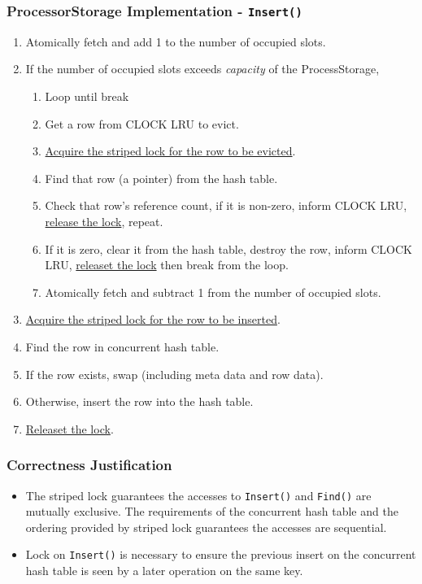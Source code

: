 \documentclass{beamer}
\begin{document}
\begin{frame}
\frametitle{ProcessorStorage Implementation - \texttt{Insert()}}
\begin{enumerate}
\item Atomically fetch and add 1 to the number of occupied slots.
\item If the number of occupied slots exceeds \emph{capacity} of the
ProcessStorage,
\begin{enumerate}
\item Loop until break
\item Get a row from CLOCK LRU to evict.
\item \underline{Acquire the striped lock for the row to be evicted}.
\item Find that row (a pointer) from the hash table.
\item Check that row's reference count, if it is non-zero, inform CLOCK LRU, 
  \underline{release the lock}, repeat.
\item If it is zero, clear it from the hash table, destroy the row,  inform CLOCK LRU,
  \underline{releaset the lock} then break from the loop.
\item Atomically fetch and subtract 1 from the number of occupied slots.
\end{enumerate}
\item \underline{Acquire the striped lock for the row to be inserted}.
\item Find the row in concurrent hash table.
\item If the row exists, swap (including meta data and row data).
\item Otherwise, insert the row into the hash table.
\item \underline{Releaset the lock}.
\end{enumerate}
\end{frame}

\begin{frame}
\frametitle{Correctness Justification}
\begin{itemize}
\item The striped lock guarantees the accesses to \texttt{Insert()} and
\texttt{Find()} are mutually exclusive. The requirements of the concurrent hash
table and the ordering provided by striped lock guarantees the accesses are
sequential.
\item Lock on \texttt{Insert()} is necessary to ensure the previous insert on the
concurrent hash table is seen by a later operation on the same key. 
\end{itemize}
\end{frame}
\end{document}
